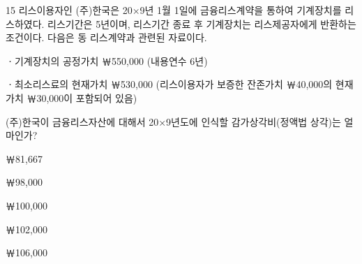 \begin{question}{15}
리스이용자인 (주)한국은 20×9년 1월 1일에 금융리스계약을 통하여 기계장치를 리스하였다. 리스기간은 5년이며, 리스기간 종료 후 기계장치는 리스제공자에게 반환하는 조건이다. 다음은 동 리스계약과 관련된 자료이다.
\begin{framedtext}
ㆍ기계장치의 공정가치 ￦550,000 (내용연수 6년) \par
ㆍ최소리스료의 현재가치 ￦530,000 (리스이용자가 보증한 잔존가치 ￦40,000의 현재가치 ￦30,000이 포함되어 있음) \par
\end{framedtext}
(주)한국이 금융리스자산에 대해서 20×9년도에 인식할 감가상각비(정액법 상각)는 얼마인가? \par
\begin{choices}
  \item ￦81,667
  \item ￦98,000
  \item ￦100,000
  \item ￦102,000
  \item ￦106,000
\end{choices}
\end{question}
